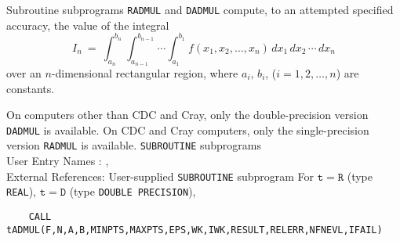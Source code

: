                           
        
                
Subroutine subprograms {\tt RADMUL} and {\tt DADMUL} compute, to an
attempted specified accuracy, the value of the integral
$$ I_n \ = \ \displaystyle
\int_{a_n}^{b_n} \int_{a_{n-1}}^{b_{n-1}} \cdots
\int_{a_1}^{b_1} f(x_1,x_2,\ldots,x_n)\,dx_1\,dx_2\,\cdots\,dx_n $$
over an $n$-dimensional rectangular region, where
$a_i,\,b_i$, ($i=1,2,\ldots,n$) are constants.
\par
On computers other than CDC and Cray, only the double-precision version
{\tt DADMUL} is available. On CDC and Cray computers,
only the single-precision version {\tt RADMUL} is available.
\Structure
{\tt SUBROUTINE} subprograms \\
User Entry Names : , \\
External References: User-supplied {\tt SUBROUTINE} subprogram
\Usage
For $\mathtt{t=R}$ (type {\tt REAL}), $\mathtt{t=D}$ (type
{\tt DOUBLE PRECISION}),
\begin{verbatim}
    CALL tADMUL(F,N,A,B,MINPTS,MAXPTS,EPS,WK,IWK,RESULT,RELERR,NFNEVL,IFAIL)
\end{verbatim}
